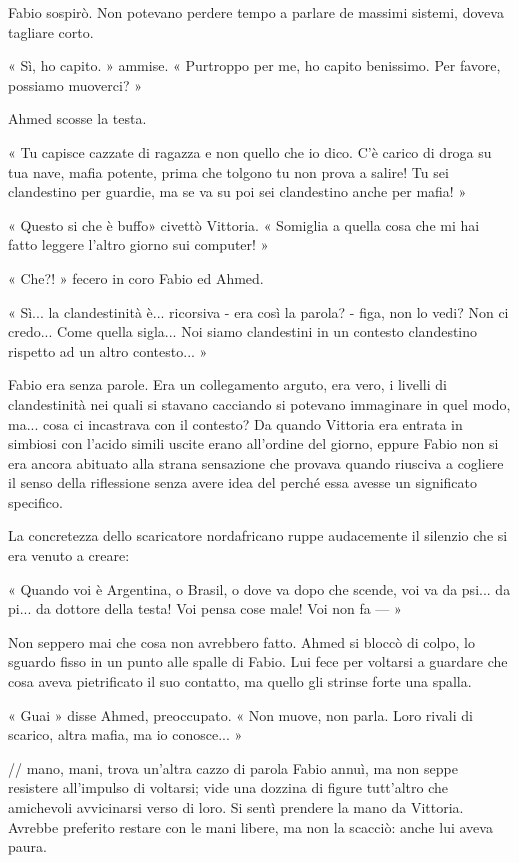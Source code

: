 Fabio sospirò. Non potevano perdere tempo a parlare de massimi sistemi, doveva tagliare corto.

« Sì, ho capito. » ammise. « Purtroppo per me, ho capito benissimo. Per favore, possiamo muoverci? »

Ahmed scosse la testa.

« Tu capisce cazzate di ragazza e non quello che io dico. C'è carico di droga su tua nave, mafia potente, prima che tolgono tu non prova a salire! Tu sei clandestino per guardie, ma se va su poi sei clandestino anche per mafia! »

« Questo si che è buffo» civettò Vittoria. « Somiglia a quella cosa che mi hai fatto leggere l'altro giorno sui computer! »

« Che?! » fecero in coro Fabio ed Ahmed.

« Sì... la clandestinità è... ricorsiva - era così la parola? - figa, non lo vedi? Non ci credo... Come quella sigla... Noi siamo clandestini in un contesto clandestino rispetto ad un altro contesto... »

Fabio era senza parole. Era un collegamento arguto, era vero, i livelli di clandestinità nei quali si stavano cacciando si potevano immaginare in quel modo, ma... cosa ci incastrava con il contesto? Da quando Vittoria era entrata in simbiosi con l'acido simili uscite erano all'ordine del giorno, eppure Fabio non si era ancora abituato alla strana sensazione che provava quando riusciva a cogliere il senso della riflessione senza avere idea del perché essa avesse un significato specifico.

La concretezza dello scaricatore nordafricano ruppe audacemente il silenzio che si era venuto a creare:

« Quando voi è Argentina, o Brasil, o dove va dopo che scende, voi va da psi... da pi... da dottore della testa! Voi pensa cose male! Voi non fa --- »

Non seppero mai che cosa non avrebbero fatto. Ahmed si bloccò di colpo, lo sguardo fisso in un punto alle spalle di Fabio. Lui fece per voltarsi a guardare che cosa aveva pietrificato il suo contatto, ma quello gli strinse forte una spalla.

« Guai » disse Ahmed, preoccupato. « Non muove, non parla. Loro rivali di scarico, altra mafia, ma io conosce... »

// mano, mani, trova un'altra cazzo di parola
Fabio annuì, ma non seppe resistere all'impulso di voltarsi; vide una dozzina di figure tutt'altro che amichevoli avvicinarsi verso di loro. Si sentì prendere la mano da Vittoria. Avrebbe preferito restare con le mani libere, ma non la scacciò: anche lui aveva paura.

